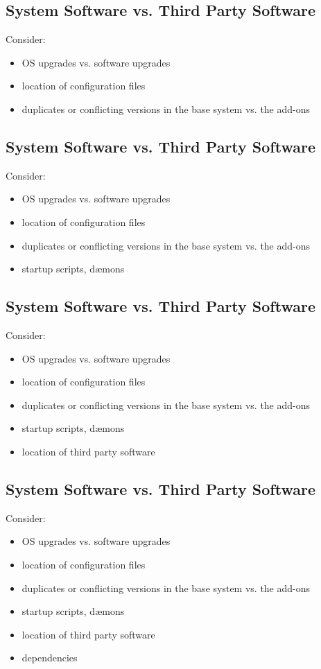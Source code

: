\documentclass[xga]{xdvislides}
\begin{document}
\subsection{System Software vs. Third Party Software}
Consider:
\begin{itemize}
	\item OS upgrades vs. software upgrades
	\item location of configuration files
	\item duplicates or conflicting versions in the base system vs. the
		add-ons
\end{itemize}

\subsection{System Software vs. Third Party Software}
Consider:
\begin{itemize}
	\item OS upgrades vs. software upgrades
	\item location of configuration files
	\item duplicates or conflicting versions in the base system vs. the
		add-ons
	\item startup scripts, d{\ae}mons
\end{itemize}

\subsection{System Software vs. Third Party Software}
Consider:
\begin{itemize}
	\item OS upgrades vs. software upgrades
	\item location of configuration files
	\item duplicates or conflicting versions in the base system vs. the
		add-ons
	\item startup scripts, d{\ae}mons
	\item location of third party software
\end{itemize}

\subsection{System Software vs. Third Party Software}
Consider:
\begin{itemize}
	\item OS upgrades vs. software upgrades
	\item location of configuration files
	\item duplicates or conflicting versions in the base system vs. the
		add-ons
	\item startup scripts, d{\ae}mons
	\item location of third party software
	\item dependencies
\end{itemize}
\end{document}
